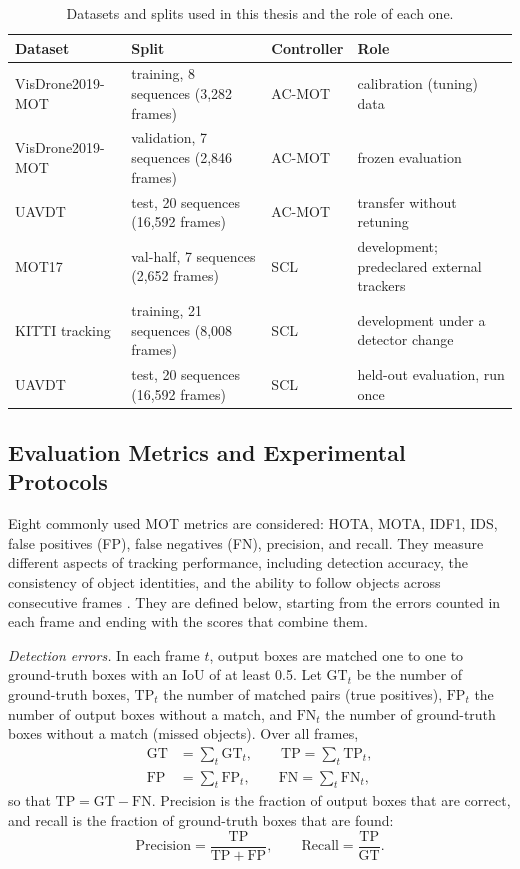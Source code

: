 \begin{table}[tbp]
\centering
\caption{Datasets and splits used in this thesis and the role of each one.}
\label{tab:bg-data}
\begin{tabular}{>{\raggedright\arraybackslash}p{2.8cm}>{\raggedright\arraybackslash}p{4.4cm}>{\raggedright\arraybackslash}p{1.9cm}>{\raggedright\arraybackslash}p{4.3cm}}
\toprule
Dataset & Split & Controller & Role\\
\midrule
VisDrone2019-MOT & training, 8 sequences (3,282 frames) & AC-MOT & calibration (tuning) data\\
VisDrone2019-MOT & validation, 7 sequences (2,846 frames) & AC-MOT & frozen evaluation\\
UAVDT & test, 20 sequences (16,592 frames) & AC-MOT & transfer without retuning\\
MOT17 & val-half, 7 sequences (2,652 frames) & SCL & development; predeclared external trackers\\
KITTI tracking & training, 21 sequences (8,008 frames) & SCL & development under a detector change\\
UAVDT & test, 20 sequences (16,592 frames) & SCL & held-out evaluation, run once\\
\bottomrule
\end{tabular}
\end{table}

\subsection{Evaluation Metrics and Experimental Protocols}\label{sec:bg-metrics}
Eight commonly used MOT metrics are considered: HOTA, MOTA, IDF1, IDS, false positives (FP), false negatives (FN), precision, and recall. They measure different aspects of tracking performance, including detection accuracy, the consistency of object identities, and the ability to follow objects across consecutive frames \cite{dendorfer2021motchallenge,luiten2021hota}. They are defined below, starting from the errors counted in each frame and ending with the scores that combine them.

\emph{Detection errors.} In each frame $t$, output boxes are matched one to one to ground-truth boxes with an IoU of at least 0.5. Let $\mathrm{GT}_t$ be the number of ground-truth boxes, $\mathrm{TP}_t$ the number of matched pairs (true positives), $\mathrm{FP}_t$ the number of output boxes without a match, and $\mathrm{FN}_t$ the number of ground-truth boxes without a match (missed objects). Over all frames,
\begin{align}
\mathrm{GT}&=\sum_t \mathrm{GT}_t,\qquad \mathrm{TP}=\sum_t \mathrm{TP}_t,\label{eq:bg-gt}\\
\mathrm{FP}&=\sum_t \mathrm{FP}_t,\qquad \mathrm{FN}=\sum_t \mathrm{FN}_t,\label{eq:bg-fpfn}
\end{align}
so that $\mathrm{TP}=\mathrm{GT}-\mathrm{FN}$. Precision is the fraction of output boxes that are correct, and recall is the fraction of ground-truth boxes that are found:
\begin{equation}
\mathrm{Precision}=\frac{\mathrm{TP}}{\mathrm{TP}+\mathrm{FP}},\qquad
\mathrm{Recall}=\frac{\mathrm{TP}}{\mathrm{GT}}.
\label{eq:bg-prrc}
\end{equation}

